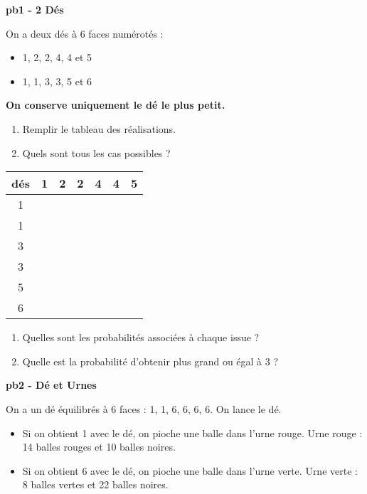 \textbf{pb1 - 2 Dés}

\begin{multicols}{2}\noindent
  On a deux dés à 6 faces numérotés : 
  \begin{itemize}[label={$\bullet$}]
    \item 1, 2, 2, 4, 4 et 5
    \item 1, 1, 3, 3, 5 et 6
  \end{itemize}

  \textbf{On conserve uniquement le dé le plus petit.} 
  \begin{enumerate}
    \item[1.] Remplir le tableau des réalisations.
    \item[2.] Quels sont tous les cas possibles ? 
  \end{enumerate}  
  \columnbreak 
  
  \begin{center}\begin{tabular}{|c|c|c|c|c|c|c|} \hline
    dés & 1 & 2 & 2 & 4 & 4 & 5 \\  \hline
      1 &   &   &   &   &   &   \\  \hline
      1 &   &   &   &   &   &   \\  \hline
      3 &   &   &   &   &   &   \\  \hline
      3 &   &   &   &   &   &   \\  \hline
      5 &   &   &   &   &   &   \\  \hline
      6 &   &   &   &   &   &   \\  \hline
  \end{tabular}\end{center}
  
  \end{multicols}
  
  \Pointilles[3] 
  \begin{enumerate}
    \item[3.] Quelles sont les probabilités associées à chaque issue ? \\ \Pointilles[6]
    \item[4.] Quelle est la probabilité d'obtenir plus grand ou égal à 3 ?\\ \Pointilles[3]  
  \end{enumerate}  


  \textbf{pb2 - Dé et Urnes}

  On a un dé équilibrés à 6 faces : 1, 1, 6, 6, 6, 6. On lance le dé. 
  
  \begin{multicols}{2}\noindent
  \begin{itemize}[label={$\bullet$}]
    \item Si on obtient 1 avec le dé, on pioche une balle dans l'urne rouge.
    Urne rouge : 14 balles rouges et 10 balles noires.
  
    \item Si on obtient 6 avec le dé, on pioche une balle dans l'urne verte.
    Urne verte : 8 balles vertes et 22 balles noires.
  \end{itemize}
  \end{multicols}
  
